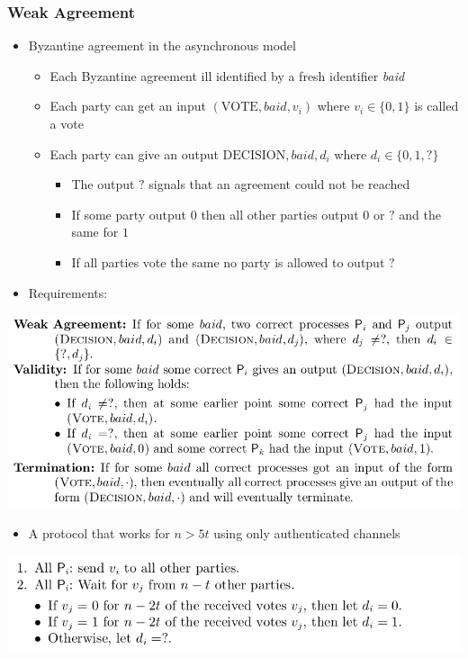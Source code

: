 \documentclass[11pt]{article}
\begin{document}
\subsubsection{Weak Agreement}
\label{sec:orgb2d91a5}
\begin{itemize}
\item Byzantine agreement in the asynchronous model
\begin{itemize}
\item Each Byzantine agreement ill identified by a fresh identifier \emph{baid}
\item Each party can get an input \((\text{VOTE}, baid, v_i)\) where \(v_i \in \{0,1\}\) is called a vote
\item Each party can give an output \(\text{DECISION}, baid, d_i\) where \(d_i \in \{0,1,?\}\)
\begin{itemize}
\item The output \(?\) signals that an agreement could not be reached
\item If some party output \(0\) then all other parties output \(0\) or \(?\) and the same for \(1\)
\item If all parties vote the same no party is allowed to output \(?\)
\end{itemize}
\end{itemize}

\item Requirements:
\end{itemize}
\begin{center}
\includegraphics[width=.9\linewidth]{Asynchronous Agreement (8)/screenshot_2018-09-29_17-47-32.png}
\end{center}

\begin{itemize}
\item A protocol that works for \(n> 5t\) using only authenticated channels
\end{itemize}
\begin{center}
\includegraphics[width=.9\linewidth]{Asynchronous Agreement (8)/screenshot_2018-09-29_17-49-39.png}
\end{center}
\end{document}
